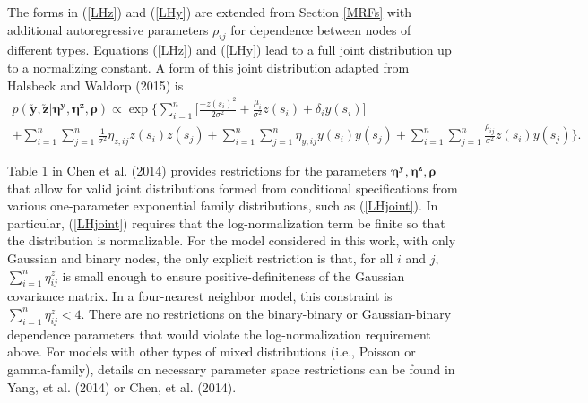 \documentclass[12pt, a4paper, twoside]{article}
\begin{document}
The forms in (\ref{LHz}) and (\ref{LHy}) are extended from Section \ref{MRFs} with additional autoregressive parameters $\rho_{ij}$ for dependence between nodes of different types.
Equations (\ref{LHz}) and (\ref{LHy}) lead to a full joint distribution up to a normalizing constant. A form of this joint distribution adapted from Halsbeck and Waldorp (2015) is
\begin{multline} \label{LHjoint}
p(\boldsymbol{\utilde{y}},\boldsymbol{\utilde{z}} | \boldsymbol{\eta^y,\eta^z,\rho}) \propto
 \exp\lbrace \sum_{i=1}^{n}\lbrack\frac{-z(s_i)^2}{2\sigma^2} + \frac{\mu_i}{\sigma^2}z(s_i) + \delta_i y(s_i) \rbrack\\
  + \sum_{i=1}^{n}\sum_{j=1}^{n}\frac{1}{\sigma^2}\eta_{z,ij}z(s_i)z(s_j) + \sum_{i=1}^{n}\sum_{j=1}^{n}\eta_{y,ij}y(s_i)y(s_j) + \sum_{i=1}^{n}\sum_{j=1}^{n}\frac{\rho_{ij}}{\sigma^2}z(s_i)y(s_j) \rbrace \textbf{.}
 \end{multline}

Table 1 in Chen et al. (2014) provides restrictions for the parameters $\boldsymbol{\eta^y,\eta^z,\rho}$ that allow for valid joint distributions formed from conditional specifications from various one-parameter exponential family distributions, such as (\ref{LHjoint}). In particular, (\ref{LHjoint}) requires that the log-normalization term be finite so that the distribution is normalizable. For the model considered in this work, with only Gaussian and binary nodes, the only explicit restriction is that, for all $i$ and $j$, $\sum_{i=1}^{n}\eta^z_{ij}$ is small enough to ensure positive-definiteness of the Gaussian covariance matrix. In a four-nearest neighbor model, this constraint is $\sum_{i=1}^{n}\eta^z_{ij}<4$. There are no restrictions on the binary-binary or Gaussian-binary dependence parameters that would violate the log-normalization requirement above. For models with other types of mixed distributions (i.e., Poisson or gamma-family), details on necessary parameter space restrictions can be found in Yang, et al. (2014) or Chen, et al. (2014).
\end{document}
